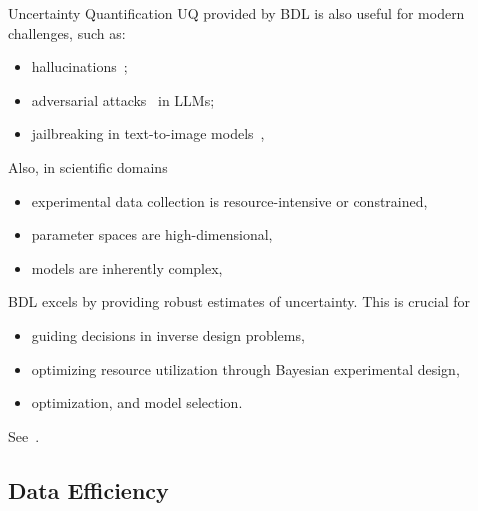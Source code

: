 \documentclass[9pt]{beamer}
\begin{document}
\begin{frame}{Uncertainty Quantification}
UQ provided by BDL is also useful for modern challenges, such as:
	\begin{itemize}[<+->]
		\item hallucinations~\citep{ji2023survey};
		\item adversarial attacks~\citep{andriushchenko2023adversarial} in LLMs;
		\item jailbreaking in text-to-image models~\citep{yang2023sneakyprompt},
	\end{itemize}	
Also, in scientific domains
\begin{itemize}[<+->]
	\item  experimental data collection is resource-intensive or constrained, 
	\item parameter spaces are high-dimensional, 
	\item models are inherently complex,
\end{itemize}
BDL excels by providing \alert{robust estimates of uncertainty}. This is crucial for 
\begin{itemize}[<+->]
	\item guiding decisions in inverse design problems, 
	\item optimizing resource utilization through Bayesian experimental design, 
	\item optimization, and model selection.
\end{itemize}
See~\citet{li2023study, Rainforth2023ModernBE, bamler2020augmenting,immer2021scalable,immer2023stochastic}.
\end{frame}

\subsection{Data Efficiency}
\end{document}

